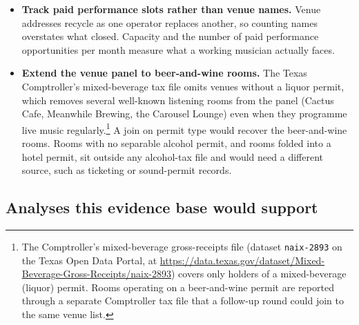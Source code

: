 \begin{itemize}
{      Board (the Legislature's fiscal research office) twice a year, and no
      parallel rider covers the music rebate, so the rebate's recipient list
      stays unpublished unless someone asks for it.}
\item \textbf{Track paid performance slots rather than venue names.} Venue
      addresses recycle as one operator replaces another, so counting names
      overstates what closed. Capacity and the number of paid performance
      opportunities per month measure what a working musician actually faces.
\item \textbf{Extend the venue panel to beer-and-wine rooms.} The Texas
      Comptroller's mixed-beverage tax file omits venues without a liquor
      permit, which removes several well-known listening rooms from the panel
      (Cactus Cafe, Meanwhile Brewing, the Carousel Lounge) even when they
      programme live music regularly.\footnote{The Comptroller's mixed-beverage
      gross-receipts file (dataset \texttt{naix-2893} on the Texas Open Data
      Portal, at
      \url{https://data.texas.gov/dataset/Mixed-Beverage-Gross-Receipts/naix-2893})
      covers only holders of a mixed-beverage (liquor) permit. Rooms operating
      on a beer-and-wine permit are reported through a separate Comptroller
      tax file that a follow-up round could join to the same venue list.}
      A join on permit type would recover the beer-and-wine rooms. Rooms with
      no separable alcohol permit, and rooms folded into a hotel permit, sit
      outside any alcohol-tax file and would need a different source, such as
      ticketing or sound-permit records.
\end{itemize}

\subsection*{Analyses this evidence base would support}

